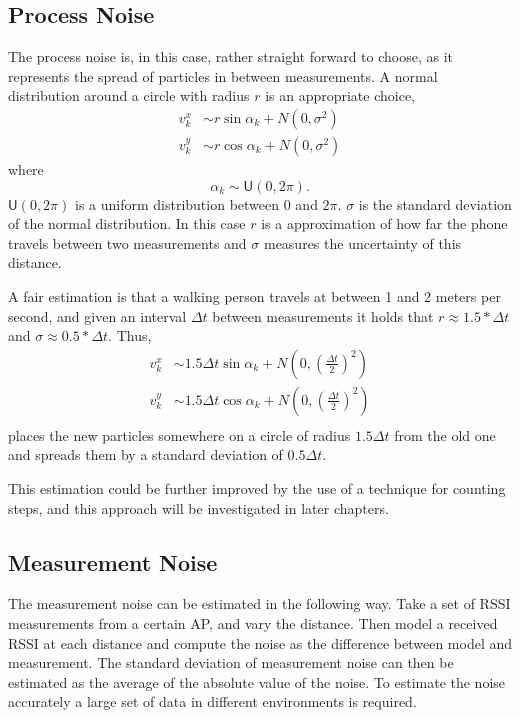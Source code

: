 \documentclass{LTHthesis}
\begin{document}
\subsection{Process Noise}  
%
The process noise is, in this case, rather straight forward to choose, as it represents the spread of particles in between measurements. A normal distribution around a circle with radius $r$ is an appropriate choice,
%
\begin{eqnarray}
v^x_k &\sim r\sin{\alpha_k}+N(0,\sigma^2)\\
v^y_k &\sim r\cos{\alpha_k}+N(0,\sigma^2)
\end{eqnarray}
%
where
%
\begin{equation}
\alpha_k \sim \mathsf U(0,2\pi).
\end{equation}
%
$\mathsf{U}(0,2\pi)$ is a uniform distribution between $0$ and $2\pi$. $\sigma$ is the standard deviation of the normal distribution. In this case $r$ is a approximation of how far the phone travels between two measurements and $\sigma$ measures the uncertainty of this distance. 

A fair estimation is that a walking person travels at between 1 and 2 meters per second, and given an interval $\Delta t$ between measurements it holds that $r \approx 1.5*\Delta t$ and $\sigma \approx 0.5*\Delta t$. Thus,
%
\begin{eqnarray}
v^x_k&\sim 1.5\Delta t \sin{\alpha_k} + N \left(0, \left(\frac{\Delta t}{2}\right)^2\right)\\
v^y_k&\sim 1.5\Delta t \cos{\alpha_k} + N \left(0, \left(\frac{\Delta t}{2}\right)^2\right)\\
\end{eqnarray}
places the new particles somewhere on a circle of radius $1.5\Delta t$ from the old one and spreads them by a standard deviation of $0.5\Delta t$.

This estimation could be further improved by the use of a technique for counting steps, and this approach will be investigated in later chapters.    
%
\subsection{Measurement Noise}
%
The measurement noise can be estimated in the following way. Take a set of RSSI measurements from a certain AP, and vary the distance. Then model a received RSSI at each distance and compute the noise as the difference between model and measurement. The standard deviation of measurement noise can then be estimated as the average of the absolute value of the noise. To estimate the noise accurately a large set of data in different environments is required.
\end{document}
